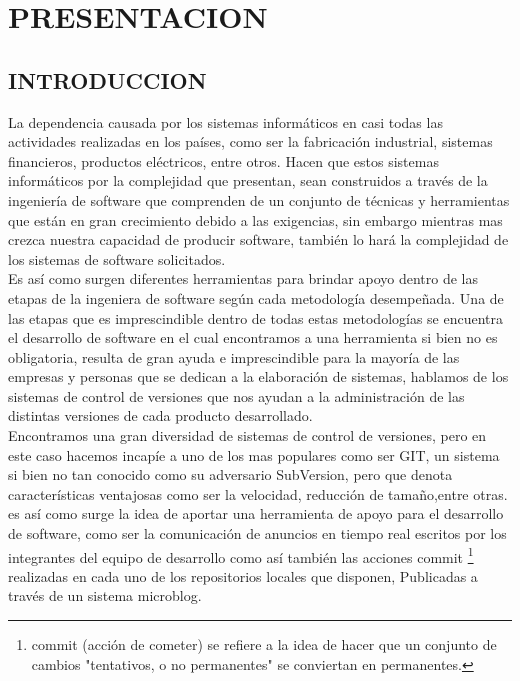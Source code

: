 

%
\chapter{PRESENTACION}
\section{INTRODUCCION}
La dependencia causada por los sistemas informáticos en casi todas las actividades realizadas en los países, como ser la fabricación industrial, sistemas financieros, productos eléctricos, entre otros.
Hacen que estos sistemas informáticos por la complejidad que presentan, sean construidos a través de la ingeniería de software que comprenden de un conjunto de técnicas y herramientas que están en gran crecimiento debido a las exigencias, sin embargo mientras mas crezca nuestra capacidad de producir software, también lo hará la complejidad de los sistemas de software solicitados.\\

Es así como surgen diferentes herramientas para brindar apoyo dentro de las etapas de la ingeniera de software según cada metodología desempeñada. Una de las etapas que es imprescindible dentro de todas estas metodologías se encuentra el desarrollo de software en el cual encontramos a una herramienta si bien no es obligatoria, resulta de gran ayuda e imprescindible para la mayoría de las empresas y personas que se dedican a la elaboración de sistemas, hablamos de los sistemas de control de versiones que nos ayudan a la administración de las distintas versiones de cada producto desarrollado.\\

Encontramos una gran diversidad de sistemas de control de versiones, pero en este caso hacemos incapíe a uno de los mas populares como ser GIT, un sistema si bien no tan conocido como su adversario SubVersion, pero que denota características ventajosas como ser la velocidad, reducción de tamaño,entre otras. es así como surge la idea de aportar una herramienta de apoyo para el desarrollo de software, como ser la comunicación de anuncios en tiempo real escritos por los integrantes del equipo de desarrollo como así también las acciones commit \footnote{commit (acción de cometer) se refiere a la idea de hacer que un conjunto de cambios "tentativos, o no permanentes" se conviertan en permanentes.} realizadas en cada uno de los repositorios locales que disponen, Publicadas a través de un sistema microblog.\\

